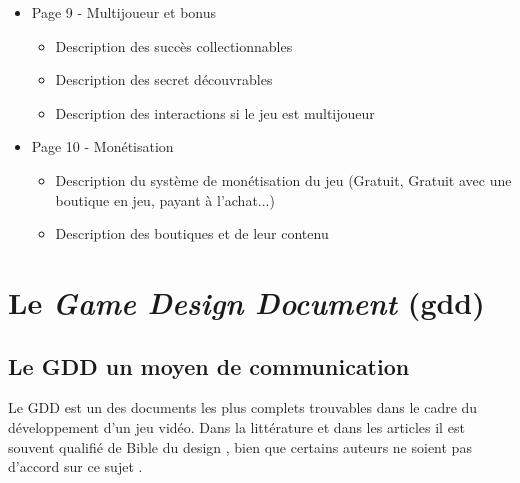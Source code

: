 \begin{itemize}
\begin{itemize}
    \end{itemize}
    \item Page 9 - Multijoueur et bonus
    \begin{itemize}
        \item Description des succès collectionnables
        \item Description des secret découvrables
        \item Description des interactions si le jeu est multijoueur
    \end{itemize}
    \item Page 10 - Monétisation
    \begin{itemize}
        \item Description du système de monétisation du jeu (Gratuit, Gratuit avec une boutique en jeu, payant à l'achat...)
        \item Description des boutiques et de leur contenu
    \end{itemize}
\end{itemize}




\section{Le \emph{Game Design Document} (\gls{gdd})}





\subsection{Le GDD un moyen de communication}
Le GDD est un des documents les plus complets trouvables dans le cadre du développement d'un jeu vidéo. Dans la littérature et dans les articles il est souvent qualifié de \guillemotleft Bible du design \guillemotright \cite{GD_foundations_pedersen}, bien que certains auteurs ne soient pas d'accord sur ce sujet \cite{LevelUpRogers2014}. 

